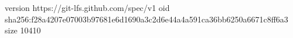 version https://git-lfs.github.com/spec/v1
oid sha256:f28a4207e07003b97681e6d1690a3c2d6e44a4a591ca36bb6250a6671c8ff6a3
size 10410
